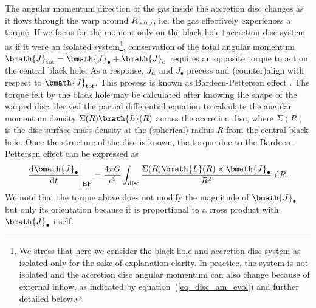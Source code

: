 \documentclass[a4paper,fleqn,usenatbib]{mnras}
\begin{document}
The angular momentum direction of the gas inside the accretion disc changes as it flows through the warp around $R_{\rm warp}$, i.e. the gas effectively experiences a torque. 
If we focus for the moment only on the black hole+accretion disc system as if it were an isolated system\footnote{We stress that here we consider the black hole and accretion disc system as isolated only for the sake of explanation clarity.
In practice, the system is not isolated and the accretion disc angular momentum can also change because of external inflow, as indicated by equation~(\ref{eq_disc_am_evol}) and further detailed below.},  conservation of the total angular momentum $\bmath{J}_{\rm tot} = \bmath{J}_{\bullet} + \bmath{J}_{\rm d}$ requires an  opposite torque to act on the central black hole.
As a response, $J_{\rm d}$ and $J_{\bullet}$ precess and (counter)align with respect to $\bmath{J}_{\rm tot}$.
This process is known as Bardeen-Petterson effect \citep{bardeen+75}.
The torque felt by the black hole may be calculated after knowing the shape of the warped disc.
\citet{pringle+92} derived the partial differential equation to calculate the angular momentum density $\Sigma(R) \bmath{L}(R)$ across the accretion disc, where $\Sigma(R)$ is the disc surface mass density at the (spherical) radius $R$ from the central black hole.
Once the structure of the disc is known, the torque due to the Bardeen-Petterson effect can be expressed as
\begin{equation}\label{eq_torque_BP}
\left. \frac{{\rm d}\bmath{J}_{\bullet}}{{\rm d}t} \right|_{\rm BP} = \frac{4 \pi G}{c^2} \int_{\rm disc} \frac{\Sigma(R) \bmath{L}(R) \times \bmath{J}_{\bullet}}{R^2}~{\rm d}R.
\end{equation}
We note that the torque above does not modify the magnitude of $\bmath{J}_{\bullet}$ but only its orientation because it is proportional to a cross product with $\bmath{J}_{\bullet}$ itself.
\end{document}
